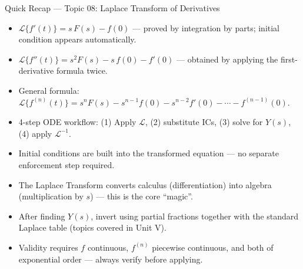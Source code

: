 \documentclass[12pt,a4paper]{article}
\begin{document}
\begin{learnbox}{Quick Recap --- Topic 08: Laplace Transform of Derivatives}
\begin{itemize}[noitemsep]
  \item $\mathcal{L}\{f'(t)\} = s\,F(s) - f(0)$ --- proved by integration
        by parts; initial condition appears automatically.
  \item $\mathcal{L}\{f''(t)\} = s^2F(s) - s\,f(0) - f'(0)$ --- obtained
        by applying the first-derivative formula twice.
  \item General formula: $\mathcal{L}\{f^{(n)}(t)\} = s^n F(s) -
        s^{n-1}f(0) - s^{n-2}f'(0) - \cdots - f^{(n-1)}(0)$.
  \item 4-step ODE workflow: (1) Apply $\mathcal{L}$, (2) substitute ICs,
        (3) solve for $Y(s)$, (4) apply $\mathcal{L}^{-1}$.
  \item Initial conditions are built into the transformed equation ---
        no separate enforcement step required.
  \item The Laplace Transform converts calculus (differentiation) into
        algebra (multiplication by $s$) --- this is the core ``magic''.
  \item After finding $Y(s)$, invert using partial fractions together with
        the standard Laplace table (topics covered in Unit V).
  \item Validity requires $f$ continuous, $f^{(n)}$ piecewise continuous,
        and both of exponential order --- always verify before applying.
\end{itemize}
\end{learnbox}
\end{document}
